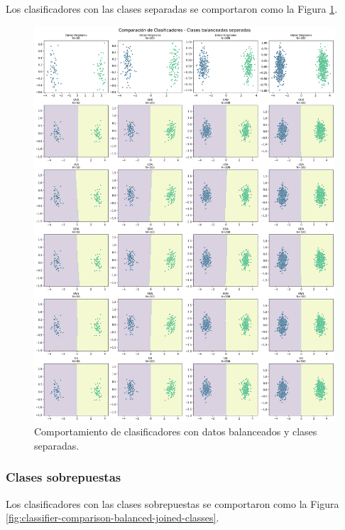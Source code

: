 \documentclass[10pt]{article}
\begin{document}
Los clasificadores con las clases separadas se comportaron como la Figura
\ref{fig:classifier-comparison-balanced-separated-classes}.
\begin{figure}[!ht]
    \centering
    \includegraphics[height=0.4\textheight]{./Parte 2/figures/classifier_comparison_balanced_separated_classes.png}
    \caption{Comportamiento de clasificadores con datos balanceados y clases separadas.}    
    \label{fig:classifier-comparison-balanced-separated-classes}
\end{figure}

\newpage

\subsubsection*{Clases sobrepuestas}

Los clasificadores con las clases sobrepuestas se comportaron como la Figura
\ref{fig:classifier-comparison-balanced-joined-classes}.
\end{document}
